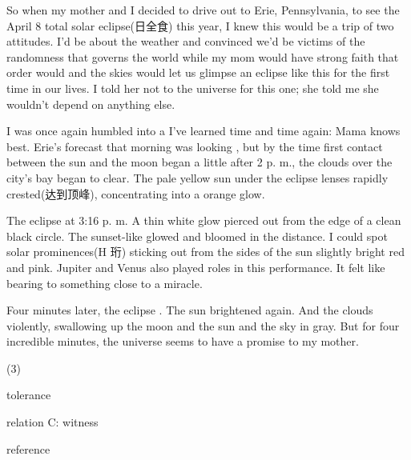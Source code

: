 \documentclass{英语试卷}
\begin{document}
\par So when my mother and I decided to drive out to Erie, Pennsylvania, to see the April 8 total solar eclipse(日全食) this year, I knew this would be a trip of two  attitudes. I'd be  about the weather and convinced we'd be victims of the randomness that governs the world while my mom would have strong faith that order would  and the skies would let us glimpse an eclipse like this for the first time in our lives. I told her not to  the universe for this one; she told me she wouldn't depend on anything else.\par
\par I was once again humbled into a  I've learned time and time again: Mama knows best. Erie's forecast that morning was looking , but by the time first contact between the sun and the moon began a little after 2 p. m., the clouds over the city's bay began to clear. The pale yellow sun under the eclipse lenses rapidly crested(达到顶峰), concentrating into a  orange glow.\par
\par The eclipse  at 3:16 p. m. A thin white glow pierced out from the edge of a clean black circle. The sunset-like  glowed and bloomed in the distance. I could spot solar prominences(H 珩) sticking out from the sides of the sun  slightly bright red and pink. Jupiter and Venus also played roles in this performance. It felt like bearing  to something close to a miracle.\par
\par Four minutes later, the eclipse . The sun brightened again. And the clouds  violently, swallowing up the moon and the sun and the sky in gray. But for four incredible minutes, the universe seems to have  a promise to my mother.\par
{}
\begin{choices}(3)
  \item tolerance
  \item relation C: witness
  \item reference
\end{choices}
\end{document}
